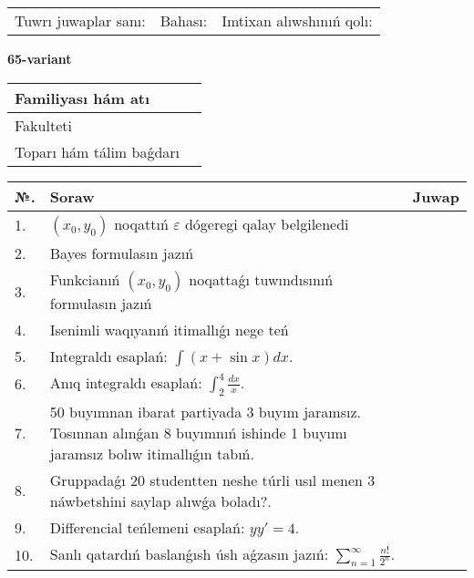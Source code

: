 \documentclass{article}
\begin{document}
\vspace{1cm}

\begin{tabular}{ c c c }
Tuwrı juwaplar sanı: \underline{\hspace{2cm}} & Bahası: \underline{\hspace{2cm}} & Imtixan alıwshınıń qolı: \underline{\hspace{2cm}} \\
\end{tabular}

\newpage

\begin{center}\textbf{65-variant}\end{center}

\bgroup
\def\arraystretch{1.5}
\begin{tabular}{ |m{6cm}|m{10cm}| }
  \hline
  Familiyası hám atı & \\
  \hline
  Fakulteti &\\
  \hline
  Toparı hám tálim baǵdarı & \\
  \hline
\end{tabular}
\egroup

\vspace{0.5cm}

\bgroup
\def\arraystretch{2}
\begin{tabular}{ |l|m{8cm}|m{7cm}| }
  \hline
  №. & Soraw & Juwap \\
  \hline
  1. & $(x_{0} , y_{0})$ noqattıń $\varepsilon$ dógeregi qalay belgilenedi &  \\
  \hline
  2. & Bayes formulasın jazıń &  \\
  \hline
  3. & Funkcianıń $(x_{0}, y_{0})$ noqattaǵı tuwındısınıń formulasın jazıń &  \\
  \hline
  4. & Isenimli waqıyanıń itimallıǵı nege teń &  \\
  \hline
  5. & Integraldı esaplań: $\displaystyle\int (x + \sin x)dx$. &  \\
  \hline
  6. & Anıq integraldı esaplań: $\displaystyle\int_{2}^{4}\frac{dx}{x}$. &  \\
  \hline
  7. & 50 buyımnan ibarat partiyada 3 buyım jaramsız. Tosınnan alınǵan 8 buyımnıń ishinde 1 buyımı jaramsız bolıw itimallıǵın tabıń. &  \\
  \hline
  8. & Gruppadaǵı 20 studentten neshe túrli usıl menen 3 náwbetshini saylap alıwǵa boladı?. &  \\
  \hline
  9. & Differencial teńlemeni esaplań: $yy'= 4$. &  \\
  \hline
  10. & Sanlı qatardıń baslanǵısh úsh aǵzasın jazıń: $\displaystyle\sum_{n = 1}^{\infty}\frac{n!}{2^{n}}$. &  \\
  \hline
\end{tabular}
\egroup
\end{document}
